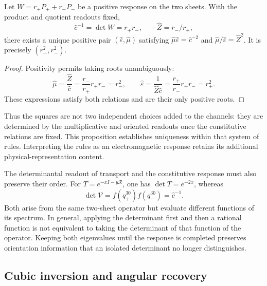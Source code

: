 \begin{proposition}
Let $W=r_+P_++r_-P_-$ be a positive response on the two sheets.
With the product and quotient readouts fixed,
\[
 \widehat c^{-1}=\det W=r_+r_-,
 \qquad \widehat Z=r_-/r_+,
\]
there exists a unique positive pair $(\widehat\varepsilon,\widehat\mu)$
satisfying
$\widehat\mu\widehat\varepsilon=\widehat c^{-2}$ and
$\widehat\mu/\widehat\varepsilon=\widehat Z^2$.
It is precisely $(r_+^2,r_-^2)$.
\end{proposition}
\begin{proof}
Positivity permits taking roots unambiguously:
\[
 \widehat\mu=\frac{\widehat Z}{\widehat c}
 =\frac{r_-}{r_+}r_+r_-=r_-^2,\qquad
 \widehat\varepsilon=\frac1{\widehat Z\widehat c}
 =\frac{r_+}{r_-}r_+r_-=r_+^2.
\]
These expressions satisfy both relations and are their only positive
roots.
\end{proof}

Thus the squares are not two independent choices added
to the channels: they are determined by the multiplicative and oriented
readouts once the constitutive relations are fixed. This proposition
establishes uniqueness within that system of rules. Interpreting
the rules as an electromagnetic response retains its additional
physical-representation content.

The determinantal readout of transport and the constitutive response
must also preserve their order. For $T=e^{-xI-y\mathcal R}$, one has
$\det T=e^{-2x}$, whereas
\[
 \det\mathcal V=f(q_+^{30})f(q_-^{30})=\widehat c^{-1}.
\]
Both arise from the same two-sheet operator but evaluate different
functions of its spectrum. In general, applying the determinant first
and then a rational function is not equivalent to taking the determinant of
that function of the operator. Keeping both eigenvalues until the
response is completed preserves orientation information that an isolated
determinant no longer distinguishes.

\subsection{Cubic inversion and angular recovery}

